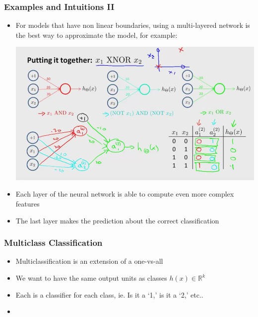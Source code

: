 \subsubsection{Examples and Intuitions II}
\begin{itemize}[--]
	\item For models that have non linear boundaries, using a multi-layered network is the best way to approximate the model, for example:
	\begin{center}
		\includegraphics[scale=0.5]{sections/cs229/w5/xnor_nn.png}
	\end{center}

	\item Each layer of the neural network is able to compute even more complex features
	\item The last layer makes the prediction about the correct classification
\end{itemize}

\subsubsection{Multiclass Classification}
\begin{itemize}[--]
	\item Multiclassification is an extension of a one-vs-all 
	\item We want to have the same output units as classes $h(x)\in\mathbb{R}^k$
	\item Each is a classifier for each class, ie. Is it a `1,' is it a `2,' etc..
	\item 
\end{itemize}